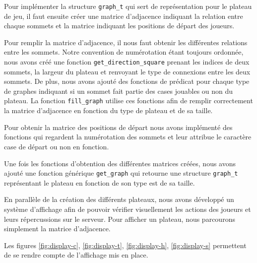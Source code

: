 \documentclass[11pt]{article}
\begin{document}
Pour implémenter la structure \texttt{graph\_t} qui sert de représentation pour le plateau de jeu, il faut ensuite créer une matrice d'adjacence indiquant la relation entre chaque sommets et la matrice indiquant les positions de départ des joueurs.

Pour remplir la matrice d'adjacence, il nous faut obtenir les différentes relations entre les sommets. Notre convention de numérotation étant toujours ordonnée, nous avons créé une fonction \texttt{get\_direction\_square} prenant les indices de deux sommets, la largeur du plateau et renvoyant le type de connexions entre les deux sommets. De plus, nous avons ajouté des fonctions de prédicat pour chaque type de graphes indiquant si un sommet fait partie des cases jouables ou non du plateau. La fonction \texttt{fill\_graph} utilise ces fonctions afin de remplir correctement la matrice d'adjacence en fonction du type de plateau et de sa taille.

Pour obtenir la matrice des positions de départ nous avons implémenté des fonctions qui regardent la numérotation des sommets et leur attribue le caractère case de départ ou non en fonction. 

Une fois les fonctions d'obtention des différentes matrices créées, nous avons ajouté une fonction générique \texttt{get\_graph} qui retourne une structure \texttt{graph\_t} représentant le plateau en fonction de son type est de sa taille.

En parallèle de la création des différents plateaux, nous avons développé un système d'affichage afin de pouvoir vérifier visuellement les actions des joueurs et leurs répercussions sur le serveur. Pour afficher un plateau, nous parcourons simplement la matrice d'adjacence. 

Les figures \ref{fig:display-c}, \ref{fig:display-t}, \ref{fig:display-h}, \ref{fig:display-s} permettent de se rendre compte de l'affichage mis en place.
\end{document}
